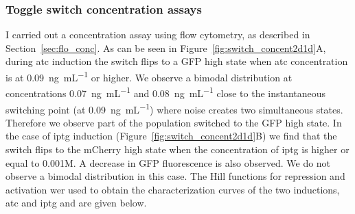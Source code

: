 \subsubsection{Toggle switch concentration assays}

I carried out a concentration assay using flow cytometry, as described in Section~\ref{sec:flo_conc}. As can be seen in Figure~\ref{fig:switch_concent2d1d}A, during \acrshort{atc} induction the switch flips to a GFP high state when \acrshort{atc} concentration is at \SI{0.09}{\nano\gram\per\milli\liter} or higher. We observe a bimodal distribution at concentrations \SI{0.07}{\nano\gram\per\milli\liter} and \SI{0.08}{\nano\gram\per\milli\liter} close to the instantaneous switching point (at \SI{0.09}{\nano\gram\per\milli\liter}) where noise creates two simultaneous states. Therefore we observe part of the population switched to the GFP high state. In the case of \acrshort{iptg} induction (Figure~\ref{fig:switch_concent2d1d}B) we find that the switch flips to the mCherry high state when the concentration of \acrshort{iptg} is higher or equal to 0.001M. A decrease in GFP fluorescence is also observed. We do not observe a bimodal distribution in this case. The Hill functions for repression and activation wer used to obtain the characterization curves of the two inductions, \acrshort{atc} and \acrshort{iptg} and are given below. 

